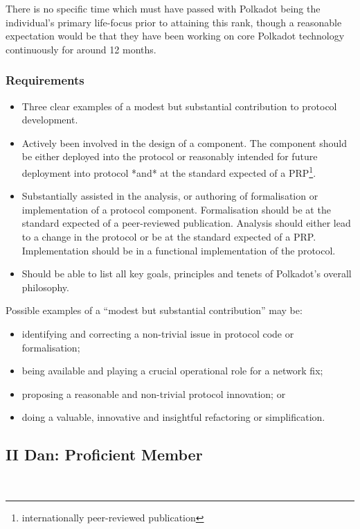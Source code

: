 \documentclass[9pt,oneside]{amsart}
\begin{document}
There is no specific time which must have passed with Polkadot being the individual's primary life-focus prior to attaining this rank, though a reasonable expectation would be that they have been working on core Polkadot technology continuously for around 12 months.

\subsubsection{Requirements}\label{requirements-1}

\begin{itemize}
\item Three clear examples of a modest but substantial contribution to protocol development.
\item Actively been involved in the design of a component. The component should be either deployed into the protocol or reasonably intended for future deployment into protocol *and* at the standard expected of a PRP\footnote{internationally peer-reviewed publication}.
\item Substantially assisted in the analysis, or authoring of formalisation or implementation of a protocol component. Formalisation should be at the standard expected of a peer-reviewed publication. Analysis should either lead to a change in the protocol or be at the standard expected of a PRP. Implementation should be in a functional implementation of the protocol.
\item Should be able to list all key goals, principles and tenets of Polkadot's overall philosophy.
\end{itemize}

Possible examples of a ``modest but substantial contribution'' may be:

\begin{itemize}
\item identifying and correcting a non-trivial issue in protocol code or formalisation;
\item being available and playing a crucial operational role for a network fix;
\item proposing a reasonable and non-trivial protocol innovation; or
\item doing a valuable, innovative and insightful refactoring or simplification.
\end{itemize}

\subsection{II Dan: Proficient Member}\label{ii-dan-proficient-member}~\\
\end{document}
